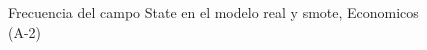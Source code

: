 \begin{figure}[H]
    \centering
    
    \caption{Frecuencia del campo State en el modelo real y smote, Economicos (A-2)}
    \label{frecuency-State-smote-enc}
\end{figure}